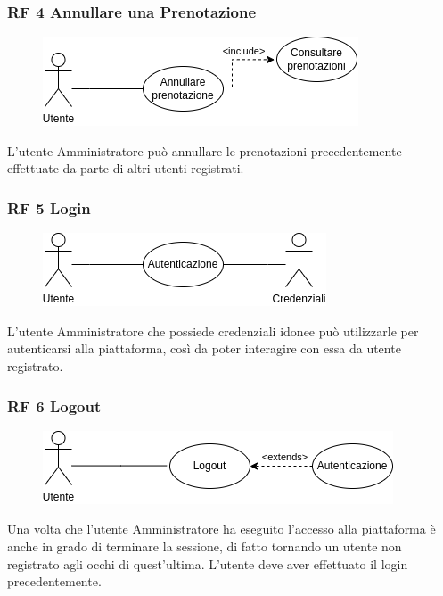 \documentclass{article}
\begin{document}
\subsubsection{RF 4 Annullare una Prenotazione}\label{rf_4}
\begin{description}
	
	\begin{figure}[htp]
		\centering
		\includegraphics[]{rf4.png}
	\end{figure}
	
	\item L'utente Amministratore può annullare le prenotazioni precedentemente effettuate da parte di altri utenti registrati.
\end{description}

\clearpage

\subsubsection{RF 5 Login}\label{rf_5}
\begin{description}
	
	\begin{figure}[htp]
		\centering
		\includegraphics[]{rf5.png}
	\end{figure}
	
	\item L'utente Amministratore che possiede credenziali idonee può utilizzarle per autenticarsi alla piattaforma, così da poter interagire con essa da utente registrato.
\end{description}

\subsubsection{RF 6 Logout}\label{rf_6}
\begin{description}
	
	\begin{figure}[htp]
		\centering
		\includegraphics[]{rf6.png}
	\end{figure}
	
	\item Una volta che l'utente Amministratore ha eseguito l'accesso alla piattaforma è anche in grado di terminare la sessione, di fatto tornando un utente non registrato agli occhi di quest'ultima. L'utente deve aver effettuato il login precedentemente. 
\end{description}
\end{document}
